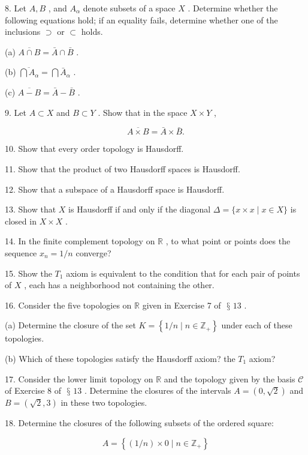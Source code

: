 \documentclass[10pt]{article}
\begin{document}
8. Let \(A,B\) , and \({A}_{\alpha }\) denote subsets of a space \(X\) . Determine whether the following equations hold; if an equality fails, determine whether one of the inclusions \(\supset\) or \(\subset\) holds.

(a) \(\overline{A \cap  B} = \bar{A} \cap  \bar{B}\) .

(b) \(\overline{\bigcap {A}_{\alpha }} = \bigcap {\bar{A}}_{\alpha }\) .

(c) \(\overline{A - B} = \bar{A} - \bar{B}\) .

9. Let \(A \subset  X\) and \(B \subset  Y\) . Show that in the space \(X \times  Y\) ,

\[
\overline{A \times  B} = \bar{A} \times  \bar{B}.
\]

10. Show that every order topology is Hausdorff.

11. Show that the product of two Hausdorff spaces is Hausdorff.

12. Show that a subspace of a Hausdorff space is Hausdorff.

13. Show that \(X\) is Hausdorff if and only if the diagonal \(\Delta  = \{ x \times  x \mid  x \in  X\}\) is closed in \(X \times  X\) .

14. In the finite complement topology on \(\mathbb{R}\) , to what point or points does the sequence \({x}_{n} = 1/n\) converge?

15. Show the \({T}_{1}\) axiom is equivalent to the condition that for each pair of points of \(X\) , each has a neighborhood not containing the other.

16. Consider the five topologies on \(\mathbb{R}\) given in Exercise 7 of \(\text{ § }{13}\) .

(a) Determine the closure of the set \(K = \left\{  {1/n \mid  n \in  {\mathbb{Z}}_{ + }}\right\}\) under each of these topologies.

(b) Which of these topologies satisfy the Hausdorff axiom? the \({T}_{1}\) axiom?

17. Consider the lower limit topology on \(\mathbb{R}\) and the topology given by the basis \(\mathcal{C}\) of Exercise 8 of \(\text{ § }{13}\) . Determine the closures of the intervals \(A = \left( {0,\sqrt{2}}\right)\) and \(B = \left( {\sqrt{2},3}\right)\) in these two topologies.

18. Determine the closures of the following subsets of the ordered square:

\[
A = \left\{  {\left( {1/n}\right)  \times  0 \mid  n \in  {\mathbb{Z}}_{ + }}\right\}
\]
\end{document}
